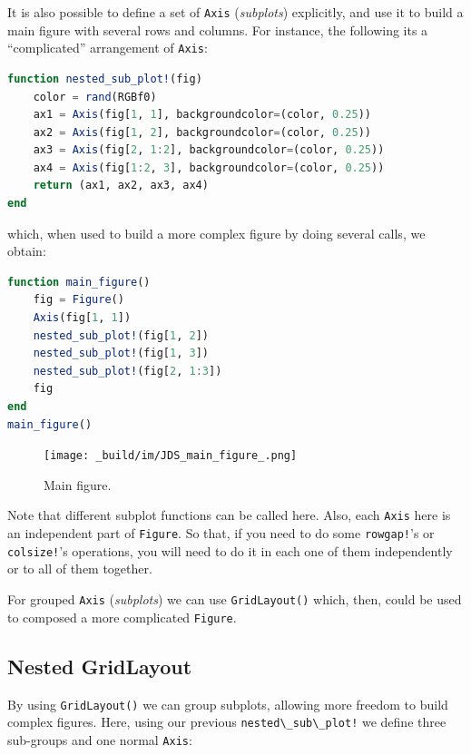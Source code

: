 \documentclass[
  notoc %
]{tufte-book}
\newcommand{\passthrough}[1]{#1}
\begin{document}
It is also possible to define a set of \passthrough{\lstinline!Axis!}
(\emph{subplots}) explicitly, and use it to build a main figure with
several rows and columns. For instance, the following its a
``complicated'' arrangement of \passthrough{\lstinline!Axis!}:

\begin{lstlisting}[language=Julia]
function nested_sub_plot!(fig)
    color = rand(RGBf0)
    ax1 = Axis(fig[1, 1], backgroundcolor=(color, 0.25))
    ax2 = Axis(fig[1, 2], backgroundcolor=(color, 0.25))
    ax3 = Axis(fig[2, 1:2], backgroundcolor=(color, 0.25))
    ax4 = Axis(fig[1:2, 3], backgroundcolor=(color, 0.25))
    return (ax1, ax2, ax3, ax4)
end
\end{lstlisting}

which, when used to build a more complex figure by doing several calls,
we obtain:

\begin{lstlisting}[language=Julia]
function main_figure()
    fig = Figure()
    Axis(fig[1, 1])
    nested_sub_plot!(fig[1, 2])
    nested_sub_plot!(fig[1, 3])
    nested_sub_plot!(fig[2, 1:3])
    fig
end
main_figure()
\end{lstlisting}

\begin{figure}
\hypertarget{fig:main_figure}{%
\centering
\texttt{[image: \_build/im/JDS\_main\_figure\_.png]}
\caption{Main figure.}\label{fig:main_figure}
}
\end{figure}

Note that different subplot functions can be called here. Also, each
\passthrough{\lstinline!Axis!} here is an independent part of
\passthrough{\lstinline!Figure!}. So that, if you need to do some
\passthrough{\lstinline"rowgap!"}'s or
\passthrough{\lstinline"colsize!"}'s operations, you will need to do it
in each one of them independently or to all of them together.

For grouped \passthrough{\lstinline!Axis!} (\emph{subplots}) we can use
\passthrough{\lstinline!GridLayout()!} which, then, could be used to
composed a more complicated \passthrough{\lstinline!Figure!}.

\hypertarget{nested-gridlayout}{%
\subsection{Nested GridLayout}\label{nested-gridlayout}}

By using \passthrough{\lstinline!GridLayout()!} we can group subplots,
allowing more freedom to build complex figures. Here, using our previous
\passthrough{\lstinline"nested\_sub\_plot!"} we define three sub-groups
and one normal \passthrough{\lstinline!Axis!}:
\end{document}
